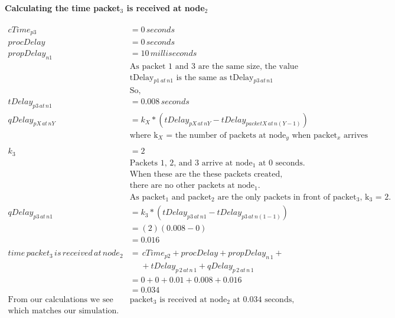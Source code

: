 \documentclass[fleqn,11pt]{article}
\begin{document}
\paragraph{Calculating the time packet$_3$ is received at node$_2$ }
\begin{align*}
cTime_{p3} &= 0\,seconds\\
procDelay &= 0\,seconds\\
propDelay_{n1} &= 10\,milliseconds\\
&\text{As packet 1 and 3 are the same size, the value for}\\
&\text{tDelay$_{p1\,at\,n1}$ is the same as tDelay${_{p3\,at\,n1}}$}\\
&\text{So,}\\
tDelay_{p3\,at\,n1} &=  0.008 \,seconds\\
qDelay_{pX\,at\,nY} &= k_{X}*(tDelay_{pX\,at\,nY} - tDelay_{packetX\,at\,n(Y-1)}) \\
&\text{where k$_X$ = the number of packets at node$_y$ when packet$_x$ arrives}\\
\\
k_{3} &= 2\\
&\text{Packets 1, 2, and 3 arrive at node$_1$ at 0 seconds.}\\
&\text{When these are the these packets created,}\\
&\text{there are no other packets at node$_1$.}\\
&\text{As packet$_1$ and packet$_2$ are the only packets in front of packet$_3$, k$_3$ = 2.} \\
qDelay_{p3\,at\,n1} &= k_{3}*(tDelay_{p3\,at\,n1} - tDelay_{p3\,at\,n(1-1)})\\
&= (2) (0.008 - 0) \\
&= 0.016 \\
\\
time\,packet_{3}\,is\,received\,at\,node_{2}  &= \,cTime_{p2} + procDelay + propDelay_{n\,1} +\\
&\,\,\,\,\,\,\,\, + tDelay_{p\,2\,at\,n\,1} + qDelay_{p\,2\,at\,n\,1} \\
&= 0 + 0 + 0.01 + 0.008 + 0.016 \\
&= 0.034\\
\text{From our calculations we see that }
&\text{packet$_3$ is received at node$_2$ at 0.034 seconds,} \\
\text{which matches our simulation.}
\end{align*}
\end{document}
